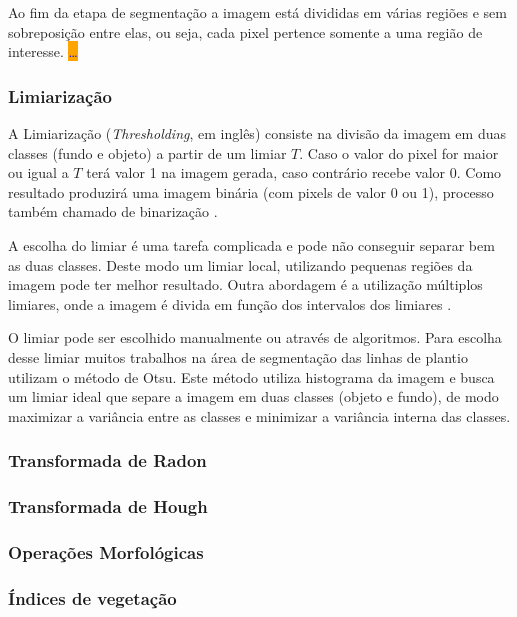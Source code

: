 \documentclass[12pt, a4paper, english, brazil]{article}
\newcommand{\dotsBlue}{\colorbox{orange}{\textcolor{blue}{\dots}}}
\begin{document}
Ao fim da etapa de segmentação a imagem está divididas em várias regiões e sem sobreposição entre elas, ou seja, cada pixel pertence somente a uma região de interesse. \dotsBlue

\subsubsection{Limiarização}
A Limiarização (\textit{Thresholding}, em inglês) consiste na divisão da imagem em duas classes (fundo e objeto) a partir de um limiar $T$. Caso o valor do pixel for maior ou igual a $T$ terá valor 1 na imagem gerada, caso contrário recebe valor 0. Como resultado produzirá uma imagem binária (com pixels de valor 0 ou 1), processo também chamado de binarização \cite{Kuruvilla_2016}.

A escolha do limiar é uma tarefa complicada e pode não conseguir separar bem as duas classes. Deste modo um limiar local, utilizando pequenas regiões da imagem pode ter melhor resultado. Outra abordagem é a utilização múltiplos limiares, onde a imagem é divida em função dos intervalos dos limiares \cite{Gonzalez_Woods_2010}.

O limiar pode ser escolhido manualmente ou através de algoritmos. Para escolha desse limiar muitos trabalhos na área de segmentação das linhas de plantio utilizam o método de Otsu. Este método \cite{Otsu_1979} utiliza histograma da imagem e busca um limiar ideal que separe a imagem em duas classes (objeto e fundo), de modo maximizar a variância entre as classes e minimizar a variância interna das classes.

\subsubsection{Transformada de Radon}

\subsubsection{Transformada de Hough}

\subsubsection{Operações Morfológicas}

\subsubsection{Índices de vegetação}
\end{document}
